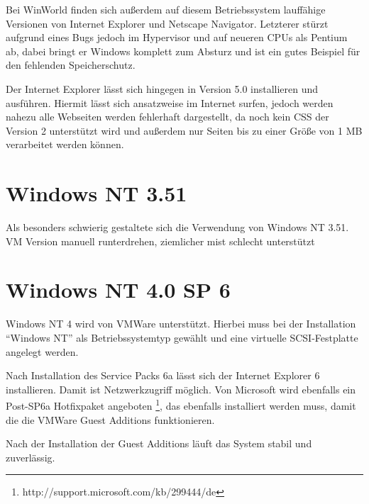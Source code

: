 	Bei WinWorld finden sich außerdem auf diesem Betriebssystem lauffähige Versionen von Internet Explorer und Netscape Navigator.
	Letzterer stürzt aufgrund eines Bugs jedoch im Hypervisor und auf neueren CPUs als Pentium ab, dabei bringt er Windows komplett zum Absturz und ist ein gutes Beispiel für den fehlenden Speicherschutz.

	Der Internet Explorer lässt sich hingegen in Version 5.0 installieren und ausführen. 
	Hiermit lässt sich ansatzweise im Internet surfen, jedoch werden nahezu alle Webseiten werden fehlerhaft dargestellt, da noch kein CSS der Version 2 unterstützt wird und außerdem nur Seiten bis zu einer Größe von 1 MB verarbeitet werden können. \\



\newpage

\section{Windows NT 3.51}

	Als besonders schwierig gestaltete sich die Verwendung von Windows NT 3.51. 
VM Version manuell runterdrehen, ziemlicher mist
schlecht unterstützt

\section{Windows NT 4.0 SP 6}

	Windows NT 4 wird von VMWare unterstützt. 
	Hierbei muss bei der Installation "`Windows NT"' als Betriebssystemtyp gewählt und eine virtuelle SCSI-Festplatte angelegt werden. 
	
	Nach Installation des Service Packs 6a lässt sich der Internet Explorer 6 installieren.
	Damit ist Netzwerkzugriff möglich. 
	Von Microsoft wird ebenfalls ein Post-SP6a Hotfixpaket angeboten \footnote{http://support.microsoft.com/kb/299444/de}, das ebenfalls installiert werden muss, damit die die VMWare Guest Additions funktionieren.

	Nach der Installation der Guest Additions läuft das System stabil und zuverlässig. 

